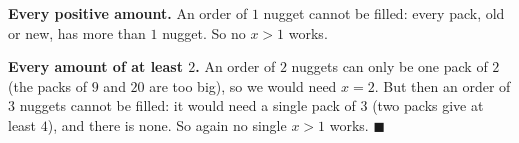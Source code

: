 \textbf{Every positive amount.} An order of $1$ nugget cannot be filled: every pack, old or new, has more than $1$ nugget. So no $x>1$ works.

\textbf{Every amount of at least $2$.} An order of $2$ nuggets can only be one pack of $2$ (the packs of $9$ and $20$ are too big), so we would need $x=2$. But then an order of $3$ nuggets cannot be filled: it would need a single pack of $3$ (two packs give at least $4$), and there is none. So again no single $x>1$ works. $\blacksquare$
